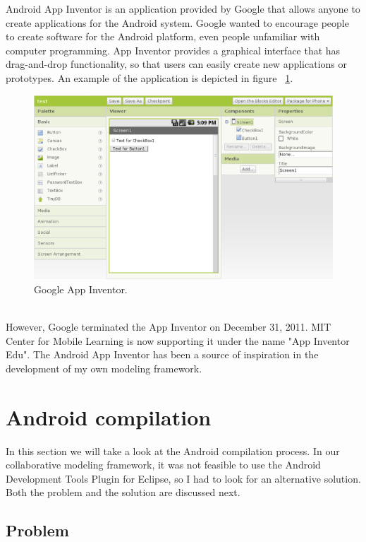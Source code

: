 Android App Inventor is an application provided by Google that allows anyone to create applications for the Android system. Google wanted to encourage people to create software for the Android platform, even people unfamiliar with computer programming. App Inventor provides a graphical interface that has drag-and-drop functionality, so that users can easily create new applications or prototypes. An example of the application is depicted in figure ~\ref{fig:app_inventor}.
\begin{figure}[h!]
\centering
\includegraphics[width=1.0\textwidth]{images/chap4_app_inventor.png}
\caption{Google App Inventor.}
\label{fig:app_inventor}
\end{figure} \\
However, Google terminated the App Inventor on December 31, 2011. MIT Center for Mobile Learning is now supporting it under the name "App Inventor Edu". The Android App Inventor has been a source of inspiration in the development of my own modeling framework. 

\section{Android compilation}

In this section we will take a look at the Android compilation process. In our collaborative modeling framework, it was not feasible to use the Android Development Tools Plugin for Eclipse, so I had to look for an alternative solution. Both the problem and the solution are discussed next.

\subsection{Problem}

